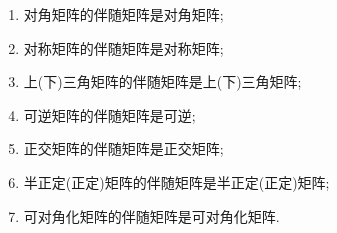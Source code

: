 \documentclass[../../main.tex]{subfiles}
\begin{document}
\begin{proposition}[伴随矩阵的继承性]\label{proposition:伴随矩阵的继承性}
\begin{enumerate}
\item\label{伴随矩阵的继承性1} 对角矩阵的伴随矩阵是对角矩阵;

\item 对称矩阵的伴随矩阵是对称矩阵;

\item 上(下)三角矩阵的伴随矩阵是上(下)三角矩阵;

\item 可逆矩阵的伴随矩阵是可逆;

\item 正交矩阵的伴随矩阵是正交矩阵;

\item 半正定(正定)矩阵的伴随矩阵是半正定(正定)矩阵;

\item 可对角化矩阵的伴随矩阵是可对角化矩阵.
\end{enumerate}
\end{proposition}
\end{document}
